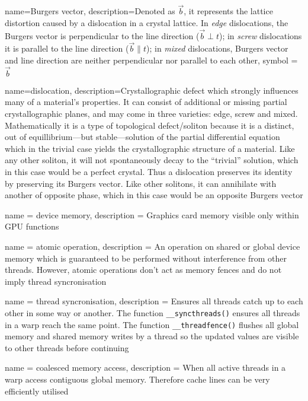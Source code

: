 {
	name={Burgers vector},
	description={Denoted as $\vec{b}$, it represents the lattice distortion caused by a dislocation in a crystal lattice. In \emph{edge} dislocations, the Burgers vector is perpendicular to the line direction ($ \vec{b} \perp t $); in \emph{screw} dislocations it is parallel to the line direction ($ \vec{b} \parallel t $); in \emph{mixed} dislocations, Burgers vector and line direction are neither perpendicular nor parallel to each other},
	symbol = {\ensuremath{\vec{b}}}
}

{
	name={dislocation},
	description={Crystallographic defect which strongly influences many of a material's properties. It can consist of additional or missing partial crystallographic planes, and may come in three varieties: edge, screw and mixed. Mathematically it is a type of topological defect/soliton because it is a distinct, out of equillibrium---but stable---solution of the partial differential equation which in the trivial case yields the crystallographic structure of a material. Like any other soliton, it will not spontaneously decay to the ``trivial'' solution, which in this case would be a perfect crystal. Thus a dislocation preserves its identity by preserving its Burgers vector. Like other solitons, it can annihilate with another of opposite phase, which in this case would be an opposite Burgers vector}
}

{
	name = {device memory},
	description = {Graphics card memory visible only within GPU functions}
}

{
	name = {atomic operation},
	description = {An operation on shared or global device memory which is guaranteed to be performed without interference from other threads. However, atomic operations don't act as memory fences and do not imply thread syncronisation \cite{nvidia_atomics}}
}

{
	name = {thread syncronisation},
	description = {Ensures all threads catch up to each other in some way or another. The function \texttt{__syncthreads()} ensures all threads in a warp reach the same point. The function \texttt{__threadfence()} flushes all global memory and shared memory writes by a thread so the updated values are visible to other threads before continuing}
}

{
	name = {coalesced memory access},
	description = {When all active threads in a warp access contiguous global memory. Therefore cache lines can be very efficiently utilised}
}

